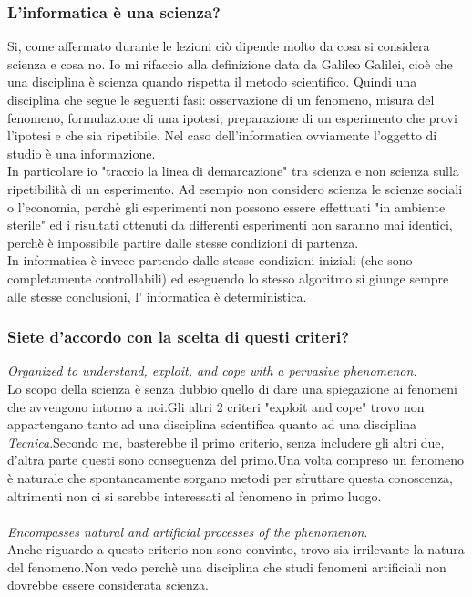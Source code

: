 \documentclass[a4paper]{article}
\begin{document}
\subsubsection{L’informatica è una scienza?}
\label{sec:Q2}
Si, come affermato durante le lezioni ciò dipende molto da cosa si considera scienza e cosa no.
Io mi rifaccio alla definizione data da Galileo Galilei, cioè che una disciplina è scienza quando rispetta il metodo scientifico.
Quindi una disciplina che segue le seguenti fasi: osservazione di un fenomeno, misura del fenomeno, formulazione di una ipotesi, preparazione di un esperimento che provi l'ipotesi e che sia ripetibile. Nel caso dell'informatica ovviamente l'oggetto di studio è una informazione.\\
In particolare io "traccio la linea di demarcazione" tra scienza e non scienza sulla ripetibilità di un esperimento. Ad esempio non considero scienza le scienze sociali o l'economia, perchè gli esperimenti non possono essere effettuati "in ambiente sterile" ed i risultati ottenuti da differenti esperimenti non saranno mai identici, perchè è impossibile partire dalle stesse condizioni di partenza.\\
In informatica è invece partendo dalle stesse condizioni iniziali (che sono completamente controllabili) ed eseguendo lo stesso algoritmo si giunge sempre alle stesse conclusioni, l' informatica è deterministica.

\subsubsection{Siete d’accordo con la scelta di questi criteri?}
\emph{Organized to understand, exploit, and cope with a pervasive phenomenon.}\\
Lo scopo della scienza è senza dubbio quello di dare una spiegazione ai fenomeni che avvengono intorno a noi.Gli altri 2 criteri "exploit and cope" trovo non appartengano tanto ad una disciplina scientifica quanto ad una disciplina \emph{Tecnica}.Secondo me, basterebbe il primo criterio, senza includere gli altri due, d'altra parte questi sono conseguenza del primo.Una volta compreso un fenomeno è naturale che spontaneamente sorgano metodi per sfruttare questa conoscenza, altrimenti non ci si sarebbe interessati al fenomeno in primo luogo.
\\\\

\emph{Encompasses natural and artificial processes of the phenomenon}.\\
Anche riguardo a questo criterio non sono convinto, trovo sia irrilevante la natura del fenomeno.Non vedo perchè una disciplina che studi fenomeni artificiali non dovrebbe essere considerata scienza.
\\\\
\end{document}
